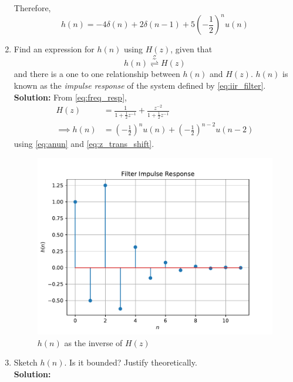 \documentclass[journal,12pt,twocolumn]{IEEEtran}
\newcommand{\solution}{\noindent \textbf{Solution: }}
\providecommand{\brak}[1]{\ensuremath{\left(#1\right)}}
\providecommand{\ztrans}{\overset{\mathcal{Z}}{ \rightleftharpoons}}
\numberwithin{equation}{section}
\renewcommand\thesection{\arabic{section}}
\begin{document}
\begin{enumerate}[label=\thesection.\arabic*]
	Therefore,
	\begin{equation}
		h(n) = -4\delta(n) + 2\delta(n - 1) + 5\brak{-\frac12}^n u(n)
	\end{equation}
\item \label{prob:impulse_resp}
Find an expression for $h(n)$ using $H(z)$, given that 
\begin{equation}
\label{eq:impulse_resp}
h(n) \ztrans H(z)
\end{equation}
and there is a one to one relationship between $h(n)$ and $H(z)$. $h(n)$ is known as the {\em impulse response} of the
system defined by \eqref{eq:iir_filter}.
\\
\solution From \eqref{eq:freq_resp},
\begin{align}
H(z) &= \frac{1}{1 + \frac{1}{2}z^{-1}} + \frac{ z^{-2}}{1 + \frac{1}{2}z^{-1}}
\\
\implies h(n) &= \brak{-\frac{1}{2}}^{n}u(n) + \brak{-\frac{1}{2}}^{n-2}u(n-2)
\end{align}
using \eqref{eq:anun} and \eqref{eq:z_trans_shift}.
\begin{figure}[!ht]
\centering
\includegraphics[width=\columnwidth]{./figs/hn}
\caption{$h(n)$ as the inverse of $H(z)$}
\label{fig:hn}
\end{figure}
\item Sketch $h(n)$. Is it bounded? Justify theoretically.
\\
\solution 


\end{enumerate}
\end{document}
